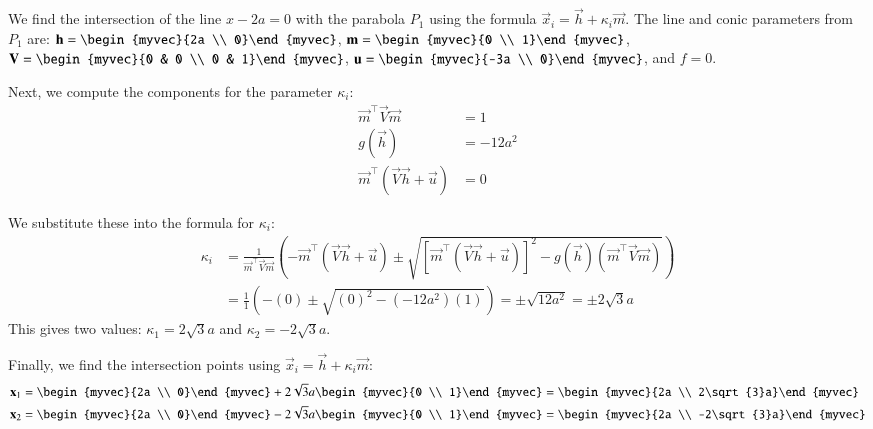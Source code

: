 \documentclass[journal]{IEEEtran}
\begin{document}
	We find the intersection of the line $x-2a=0$ with the parabola $P_1$ using the formula $\vec{x}_i = \vec{h} + \kappa_i\vec{m}$.
	The line and conic parameters from $P_1$ are:
	$\vec{h} = \begin{myvec}{2a \\ 0}\end{myvec}$, $\vec{m} = \begin{myvec}{0 \\ 1}\end{myvec}$, $\vec{V} = \begin{myvec}{0 & 0 \\ 0 & 1}\end{myvec}$, $\vec{u} = \begin{myvec}{-3a \\ 0}\end{myvec}$, and $f = 0$.
	
	Next, we compute the components for the parameter $\kappa_i$:
	\begin{align}
		\vec{m}^\top\vec{V}\vec{m} &= 1 \\
		g(\vec{h}) &= -12a^2 \\
		\vec{m}^\top(\vec{V}\vec{h} + \vec{u}) &= 0
	\end{align}
	
	We substitute these into the formula for $\kappa_i$:
	\begin{align}
		\kappa_i &= \frac{1}{\vec{m}^\top\vec{V}\vec{m}} \left( - \vec{m}^\top(\vec{V}\vec{h} + \vec{u}) \pm \sqrt{[\vec{m}^\top(\vec{V}\vec{h} + \vec{u})]^2 - g(\vec{h})(\vec{m}^\top\vec{V}\vec{m})} \right) \nonumber \\
		&= \frac{1}{1} \left( -(0) \pm \sqrt{(0)^2 - (-12a^2)(1)} \right) = \pm\sqrt{12a^2} = \pm 2\sqrt{3}a
	\end{align}
	This gives two values: $\kappa_1 = 2\sqrt{3}a$ and $\kappa_2 = -2\sqrt{3}a$.
	
	Finally, we find the intersection points using $\vec{x}_i = \vec{h} + \kappa_i\vec{m}$:
	\begin{align}
		\vec{x}_1 &= \begin{myvec}{2a \\ 0}\end{myvec} + 2\sqrt{3}a \begin{myvec}{0 \\ 1}\end{myvec} = \begin{myvec}{2a \\ 2\sqrt{3}a}\end{myvec} \label{eq:sol1} \\
		\vec{x}_2 &= \begin{myvec}{2a \\ 0}\end{myvec} - 2\sqrt{3}a \begin{myvec}{0 \\ 1}\end{myvec} = \begin{myvec}{2a \\ -2\sqrt{3}a}\end{myvec} \label{eq:sol2}
	\end{align}
	
\end{document}
